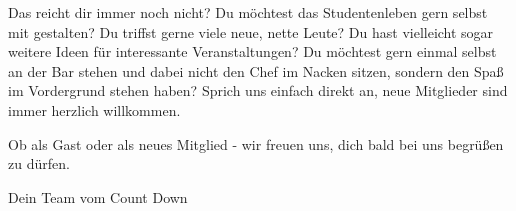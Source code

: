 Das reicht dir immer noch nicht?
Du möchtest das Studentenleben gern selbst mit gestalten?
Du triffst gerne viele neue, nette Leute?
Du hast vielleicht sogar weitere Ideen für interessante Veranstaltungen?
Du möchtest gern einmal selbst an der Bar stehen und dabei nicht den Chef im Nacken sitzen, sondern den Spaß im Vordergrund stehen haben?
Sprich uns einfach direkt an, neue Mitglieder sind immer herzlich willkommen.

Ob als Gast oder als neues Mitglied - wir freuen uns, dich bald bei uns begrüßen zu dürfen.

Dein Team vom Count Down